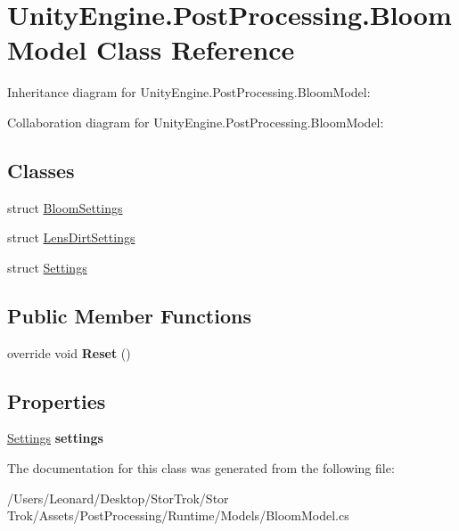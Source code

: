 \hypertarget{class_unity_engine_1_1_post_processing_1_1_bloom_model}{}\section{Unity\+Engine.\+Post\+Processing.\+Bloom\+Model Class Reference}
\label{class_unity_engine_1_1_post_processing_1_1_bloom_model}


Inheritance diagram for Unity\+Engine.\+Post\+Processing.\+Bloom\+Model\+:


Collaboration diagram for Unity\+Engine.\+Post\+Processing.\+Bloom\+Model\+:
\subsection*{Classes}
\begin{DoxyCompactItemize}
\item 
struct \hyperlink{struct_unity_engine_1_1_post_processing_1_1_bloom_model_1_1_bloom_settings}{Bloom\+Settings}
\item 
struct \hyperlink{struct_unity_engine_1_1_post_processing_1_1_bloom_model_1_1_lens_dirt_settings}{Lens\+Dirt\+Settings}
\item 
struct \hyperlink{struct_unity_engine_1_1_post_processing_1_1_bloom_model_1_1_settings}{Settings}
\end{DoxyCompactItemize}
\subsection*{Public Member Functions}
\begin{DoxyCompactItemize}
\item 
\mbox{\label{class_unity_engine_1_1_post_processing_1_1_bloom_model_afe5c14fd79a06f6ca4c0f96ae056ec07}} 
override void {\bfseries Reset} ()
\end{DoxyCompactItemize}
\subsection*{Properties}
\begin{DoxyCompactItemize}
\item 
\mbox{\label{class_unity_engine_1_1_post_processing_1_1_bloom_model_a58a11bd32da6f48ad47d0d819c6d8730}} 
\hyperlink{struct_unity_engine_1_1_post_processing_1_1_bloom_model_1_1_settings}{Settings} {\bfseries settings}
\end{DoxyCompactItemize}


The documentation for this class was generated from the following file\+:\begin{DoxyCompactItemize}
\item 
/\+Users/\+Leonard/\+Desktop/\+Stor\+Trok/\+Stor Trok/\+Assets/\+Post\+Processing/\+Runtime/\+Models/Bloom\+Model.\+cs\end{DoxyCompactItemize}
